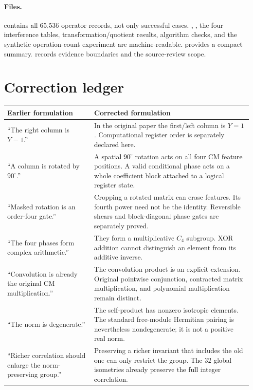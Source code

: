 \paragraph{Files.}
 contains all 65,536 operator records, not only successful cases. , , the four interference tables, transformation/quotient results, algorithm checks, and the synthetic operation-count experiment are machine-readable.  provides a compact summary.  records evidence boundaries and the source-review scope.

\section{Correction ledger}\label{app:corrections}
\begin{longtable}{@{}L{0.31\textwidth}L{0.63\textwidth}@{}}
\toprule Earlier formulation & Corrected formulation\\\midrule\endhead
``The right column is $Y=1$.'' & In the original paper the first/left column is $Y=1$. Computational register order is separately declared here.\\
``A column is rotated by $90^\circ$.'' & A spatial $90^\circ$ rotation acts on all four CM feature positions. A valid conditional phase acts on a whole coefficient block attached to a logical register state.\\
``Masked rotation is an order-four gate.'' & Cropping a rotated matrix can erase features. Its fourth power need not be the identity. Reversible shears and block-diagonal phase gates are separately proved.\\
``The four phases form complex arithmetic.'' & They form a multiplicative $C_4$ subgroup. XOR addition cannot distinguish an element from its additive inverse.\\
``Convolution is already the original CM multiplication.'' & The convolution product is an explicit extension. Original pointwise conjunction, contracted matrix multiplication, and polynomial multiplication remain distinct.\\
``The norm is degenerate.'' & The self-product has nonzero isotropic elements. The standard free-module Hermitian pairing is nevertheless nondegenerate; it is not a positive real norm.\\
``Richer correlation should enlarge the norm-preserving group.'' & Preserving a richer invariant that includes the old one can only restrict the group. The 32 global isometries already preserve the full integer correlation.\\

\end{longtable}
